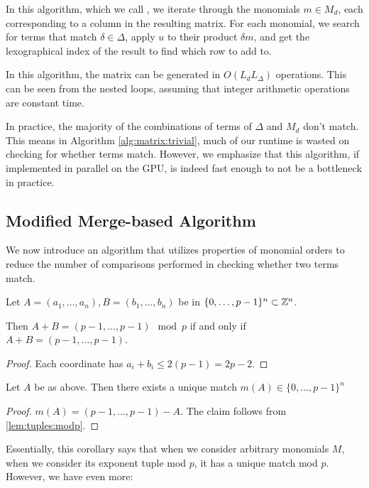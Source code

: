 In this algorithm, which we call \triv, we iterate through the monomials $m \in M_{d}$, each corresponding to a column in the
resulting matrix. For each monomial, we search for terms that match $\delta \in \Delta$, apply $u$ to their product $\delta m$, and 
get the lexographical index of the result to find which row to add to.

In this algorithm, the matrix can be generated in 
$O(L_{d}L_{\Delta})$ operations. 
This can be
seen from the nested loops, assuming that integer arithmetic operations are constant time.

In practice, the majority of the combinations of terms of $\Delta$ and $M_{d}$ don't match. This means in
Algorithm \ref{alg:matrix:trivial}, much of our runtime is wasted on checking for whether terms match.
However, we emphasize that this algorithm, if implemented in parallel on the GPU, is indeed
fast enough to not be a bottleneck in practice.

\subsection{Modified Merge-based Algorithm}

We now introduce an algorithm that utilizes properties of monomial orders to reduce the number of comparisons 
performed in checking whether two terms match.

\begin{lem}
	\label{lem:tuples:modp}
	Let \(A = (a_{1}, \ldots, a_{n}),
	B = (b_{1}, \ldots, b_{n})\)
	be in \(\{0, \ldots, p-1\}^{n} \subset \mathbb{Z}^{n}\).

	Then \(A + B = 
	(p-1, \ldots, p-1) \mod p\)
	if and only if 
	\(A + B = 
	(p-1, \ldots, p-1)\).
\end{lem}

\begin{proof}
	Each coordinate has \(a_{i} + b_{i} \leq 2(p-1) = 2p-2\).
\end{proof}

\begin{cor}
    \label{cor:unique:match}
	Let $A$ be as above.
	Then there exists a unique
	match \(m(A) \in \{0, \ldots, p-1\}^{n}\) 
\end{cor}

\begin{proof}
	\(m(A) = 
	(p-1, \ldots, p-1) - A\).
	The claim follows from 
	\ref{lem:tuples:modp}.
\end{proof}

Essentially, this corollary says that
when we consider arbitrary monomials \(M\),
when we consider its exponent tuple 
mod \(p\), it has a unique
match mod \(p\).
However, we have even more:

